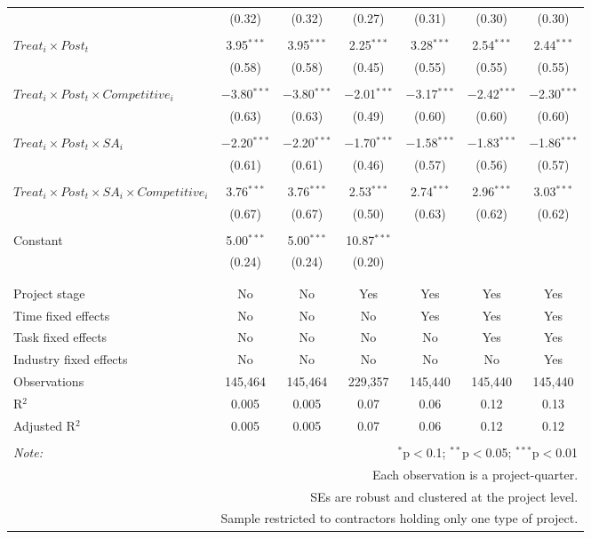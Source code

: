 \documentclass[
]{article}
\begin{document}
\begin{table}[H]
\begin{tabular}{@{\extracolsep{-3pt}}lcccccc}
  & (0.32) & (0.32) & (0.27) & (0.31) & (0.30) & (0.30) \\ 
  & & & & & & \\ 
 $Treat_i \times Post_t$ & 3.95$^{***}$ & 3.95$^{***}$ & 2.25$^{***}$ & 3.28$^{***}$ & 2.54$^{***}$ & 2.44$^{***}$ \\ 
  & (0.58) & (0.58) & (0.45) & (0.55) & (0.55) & (0.55) \\ 
  & & & & & & \\ 
 $Treat_i \times Post_t \times Competitive_i$ & $-$3.80$^{***}$ & $-$3.80$^{***}$ & $-$2.01$^{***}$ & $-$3.17$^{***}$ & $-$2.42$^{***}$ & $-$2.30$^{***}$ \\ 
  & (0.63) & (0.63) & (0.49) & (0.60) & (0.60) & (0.60) \\ 
  & & & & & & \\ 
 $Treat_i \times Post_t \times SA_i$ & $-$2.20$^{***}$ & $-$2.20$^{***}$ & $-$1.70$^{***}$ & $-$1.58$^{***}$ & $-$1.83$^{***}$ & $-$1.86$^{***}$ \\ 
  & (0.61) & (0.61) & (0.46) & (0.57) & (0.56) & (0.57) \\ 
  & & & & & & \\ 
 $Treat_i \times Post_t \times SA_i \times Competitive_i$ & 3.76$^{***}$ & 3.76$^{***}$ & 2.53$^{***}$ & 2.74$^{***}$ & 2.96$^{***}$ & 3.03$^{***}$ \\ 
  & (0.67) & (0.67) & (0.50) & (0.63) & (0.62) & (0.62) \\ 
  & & & & & & \\ 
 Constant & 5.00$^{***}$ & 5.00$^{***}$ & 10.87$^{***}$ &  &  &  \\ 
  & (0.24) & (0.24) & (0.20) &  &  &  \\ 
  & & & & & & \\ 
\hline \\[-1.8ex] 
Project stage & No & No & Yes & Yes & Yes & Yes \\ 
Time fixed effects & No & No & No & Yes & Yes & Yes \\ 
Task fixed effects & No & No & No & No & Yes & Yes \\ 
Industry fixed effects & No & No & No & No & No & Yes \\ 
Observations & 145,464 & 145,464 & 229,357 & 145,440 & 145,440 & 145,440 \\ 
R$^{2}$ & 0.005 & 0.005 & 0.07 & 0.06 & 0.12 & 0.13 \\ 
Adjusted R$^{2}$ & 0.005 & 0.005 & 0.07 & 0.06 & 0.12 & 0.12 \\ 
\hline 
\hline \\[-1.8ex] 
\textit{Note:}  & \multicolumn{6}{r}{$^{*}$p$<$0.1; $^{**}$p$<$0.05; $^{***}$p$<$0.01} \\ 
 & \multicolumn{6}{r}{Each observation is a project-quarter.} \\ 
 & \multicolumn{6}{r}{SEs are robust and clustered at the project level.} \\ 
 & \multicolumn{6}{r}{Sample restricted to contractors holding only one type of project.} \\ 
\end{tabular} 
\end{table}
\end{document}
